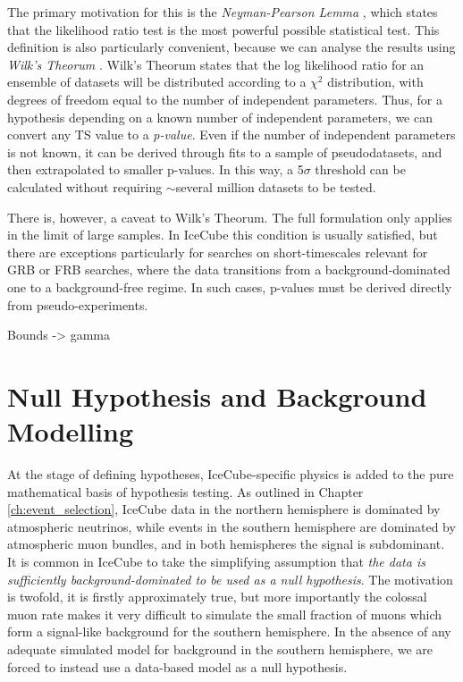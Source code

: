 The primary motivation for this is the \emph{Neyman-Pearson Lemma} , which states that the likelihood ratio test is the most powerful possible statistical test. This definition is also particularly convenient, because we can analyse the results using \emph{Wilk's Theorum} . Wilk's Theorum states that the log likelihood ratio for an ensemble of datasets will be distributed according to a $\chi^{2}$ distribution, with degrees of freedom equal to the number of independent parameters. Thus, for a hypothesis depending on a known number of independent parameters, we can convert any TS value to a \emph{p-value}. Even if the number of independent parameters is not known, it can be derived through fits to a sample of pseudodatasets, and then extrapolated to smaller p-values. In this way, a 5$\sigma$ threshold can be calculated without requiring $\sim$several million datasets to be tested.

There is, however, a caveat to Wilk's Theorum. The full formulation only applies in the limit of large samples. In IceCube this condition is usually satisfied, but there are exceptions particularly for searches on short-timescales relevant for GRB or FRB searches, where the data transitions from a background-dominated one to a background-free regime. In such cases, p-values must be derived directly from pseudo-experiments. 

Bounds -> gamma

\section{Null Hypothesis and Background Modelling}

At the stage of defining hypotheses, IceCube-specific physics is added to the pure mathematical basis of hypothesis testing. As outlined in Chapter \ref{ch:event_selection}, IceCube data in the northern hemisphere is dominated by atmospheric neutrinos, while events in the southern hemisphere are dominated by atmospheric muon bundles, and in both hemispheres the signal is subdominant. It is common in IceCube to take the simplifying assumption that \emph{the data is sufficiently background-dominated to be used as a null hypothesis}. The motivation is twofold, it is firstly approximately true, but more importantly the colossal muon rate makes it very difficult to simulate the small fraction of muons which form a signal-like background for the southern hemisphere. In the absence of any adequate simulated model for background in the southern hemisphere, we are forced to instead use a data-based model as a null hypothesis.

